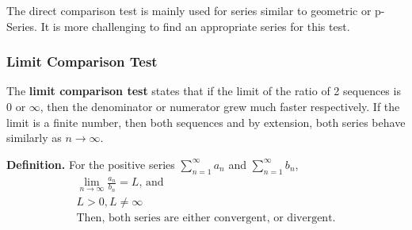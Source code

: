 \documentclass[12pt]{article}
\begin{document}
The direct comparison test is mainly used for series similar to geometric or p-Series. It is more challenging to find an appropriate series for this test.

\subsubsection{Limit Comparison Test}

The \textbf{limit comparison test} states that if the limit of the ratio of 2 sequences is $0$ or $\infty$, then the denominator or numerator grew much faster respectively. If the limit is a finite number, then both sequences and by extension, both series behave similarly as $n \rightarrow \infty$.

\textbf{Definition. } For the positive series $\displaystyle\sum_{n=1}^{\infty}a_n$ and $\displaystyle\sum_{n=1}^{\infty}b_n$,
\begin{gather*}
	\displaystyle\lim_{n\rightarrow\infty}\frac{a_n}{b_n}=L \text{, and} \\
	L > 0, L \neq \infty  \\
	\text{Then, both series are either convergent, or divergent.}
\end{gather*}
\end{document}
